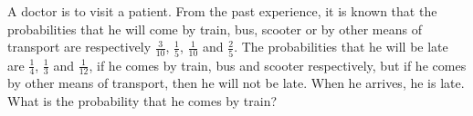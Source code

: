 \begin{flushleft}
A doctor is to visit a patient. From the past experience, it is known that the probabilities
that he will come by train, bus, scooter or by other means of transport are respectively
$\frac{3}{10}$, $\frac{1}{5}$, $\frac{1}{10}$ and $\frac{2}{5}$. The probabilities that he
will be late are $\frac{1}{4}$, $\frac{1}{3}$ and $\frac{1}{12}$, if he comes by
train, bus and scooter respectively, but if he comes by other means of transport, then he
will not be late. When he arrives, he is late. What is the probability that he comes by train?
\end{flushleft}